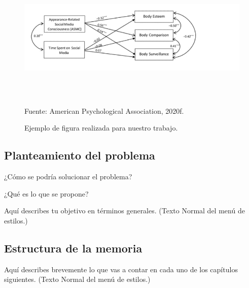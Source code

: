 \begin{figure}[h]
	\begin{center}
		\caption{Ejemplo de figura realizada para nuestro trabajo.}
		\label{fig:1}
		\includegraphics[width=4.90737in,height=2.42708in]{figura}

		\small Fuente: American Psychological Association, 2020f.
	\end{center}
\end{figure}

\subsection{Planteamiento del problema}

¿Cómo se podría solucionar el problema?

¿Qué es lo que se propone?

Aquí describes tu objetivo en términos generales. (Texto Normal del menú de estilos.)

\subsection{Estructura de la memoria}

Aquí describes brevemente lo que vas a contar en cada uno de los capítulos siguientes. (Texto Normal del menú de estilos.)
\newpage
